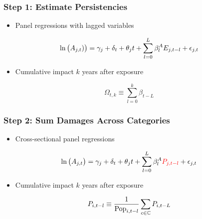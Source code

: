 \documentclass[
c,
11pt,
aspectratio=169, %
final,
]{beamer}
\begin{document}
\begin{frame}
  \frametitle{Step 1: Estimate Persistencies}
  \begin{minipage}[r]{.6\linewidth}
  \begin{itemize}
  \item Panel regressions with lagged variables
  \end{itemize}
  \begin{equation*}
    \ln\big(A_{j,t})\big) = \gamma_j + \delta_{t} + \theta_j t + \sum_{l=0}^{L}\bA_{l}E_{j,t-l}+\epsilon_{j,t}
  \end{equation*}
  \begin{itemize}
  \item Cumulative impact $k$ years after exposure
  \end{itemize}
  \begin{equation*}
    \Omega_{t,k}\equiv\sum_{l=0}^{k}\beta_{t-L}
  \end{equation*}
\end{minipage}\hfill
\begin{minipage}[r]{.39\linewidth}
\end{minipage}
\end{frame}

\begin{frame}
  \frametitle{Step 2: Sum Damages Across Categories}
    \begin{minipage}[r]{.6\linewidth}
  \begin{itemize}
  \item Cross-sectional panel regressions
  \end{itemize}
  \begin{equation*}
    \ln\big(A_{j,t}\big) = \gamma_j + \delta_{t} + \theta_j t + \sum_{l=0}^{L}\bA_{l}\tc{red}{P_{j,t-l}}+\epsilon_{j,t}
  \end{equation*}
  \begin{itemize}
  \item Cumulative impact $k$ years after exposure
  \end{itemize}
  \begin{equation*}
    P_{i,t-l}\equiv\frac{1}{\operatorname{Pop}_{i,t-l}}\sum_{c\in\mbC} P_{i,t-L}
  \end{equation*}
\end{minipage}\hfill
\begin{minipage}[r]{.39\linewidth}
\end{minipage}
\end{frame}
\end{document}
